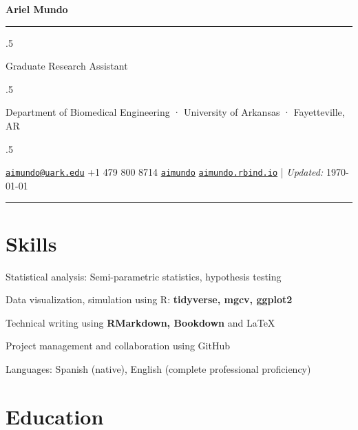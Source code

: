 \documentclass[10pt,]{article}
\providecommand{\tightlist}{%
  \setlength{\itemsep}{0pt}\setlength{\parskip}{0pt}}
\renewenvironment{itemize}{
  \begin{list}{}{
    \setlength{\leftmargin}{1.5em}
  }
}{
  \end{list}
}
\begin{document}
\centerline{\huge \bf Ariel Mundo}

\vspace{2 mm}

\hrule

\vspace{2 mm}

\moveleft.5\hoffset\centerline{Graduate Research Assistant}
\moveleft.5\hoffset\centerline{Department of Biomedical Engineering ·
University of Arkansas · Fayetteville, AR}
\moveleft.5\hoffset\centerline{ \faEnvelopeO \hspace{1 mm} \href{mailto:}{\tt \href{mailto:aimundo@uark.edu}{\nolinkurl{aimundo@uark.edu}}} \hspace{1 mm}  \faPhone \hspace{1 mm}  +1
479 800
8714  \hspace{1 mm}  \faGithub \hspace{1 mm} \href{http://github.com/aimundo}{\tt aimundo} \hspace{1 mm}     \faGlobe \hspace{1 mm} \href{http://aimundo.rbind.io}{\tt aimundo.rbind.io}    | \emph{Updated:} \apstylekinda\today}



\vspace{2 mm}

\hrule


\hypertarget{skills}{%
\section{Skills}\label{skills}}

\begin{itemize}
\tightlist
\item
  Statistical analysis: Semi-parametric statistics, hypothesis testing
\item
  Data visualization, simulation using R: \textbf{tidyverse, mgcv,
  ggplot2}
\item
  Technical writing using \textbf{RMarkdown, Bookdown} and LaTeX
\item
  Project management and collaboration using GitHub
\item
  Languages: Spanish (native), English (complete professional
  proficiency)
\end{itemize}

\hypertarget{education}{%
\section{Education}\label{education}}
\end{document}
